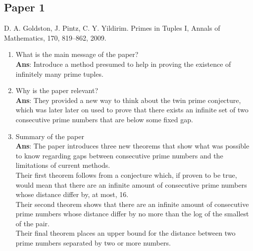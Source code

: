 \documentclass[11pt]{article}
\begin{document}
\subsection*{Paper 1}
D. A. Goldston, J. Pintz, C. Y. Yildirim. Primes in Tuples I, Annals of Mathematics, 170, 819–862, 2009.
\begin{enumerate}[label=(\alph*)]
	\item What is the main message of the paper? \\ \textbf{Ans}: Introduce a method presumed to help in proving the existence of infinitely many prime tuples.
	\item Why is the paper relevant? \\ \textbf{Ans}: They provided a new way to think about the twin prime conjecture, which was later later on used to prove that there exists an infinite set of two consecutive prime numbers that are below some fixed gap.
	\item Summary of the paper \\ \textbf{Ans}: The paper introduces three new theorems that show what was possible to know regarding gaps between consecutive prime numbers and the limitations of current methods.\\ Their first theorem follows from a conjecture which, if proven to be true, would mean that there are an infinite amount of consecutive prime numbers whose distance differ by, at most, 16.\\ Their second theorem shows that there are an infinite amount of consecutive prime numbers whose distance differ by no more than the log of the smallest of the pair.\\ Their final theorem places an upper bound for the distance between two prime numbers separated by two or more numbers.
\end{enumerate}
\end{document}
